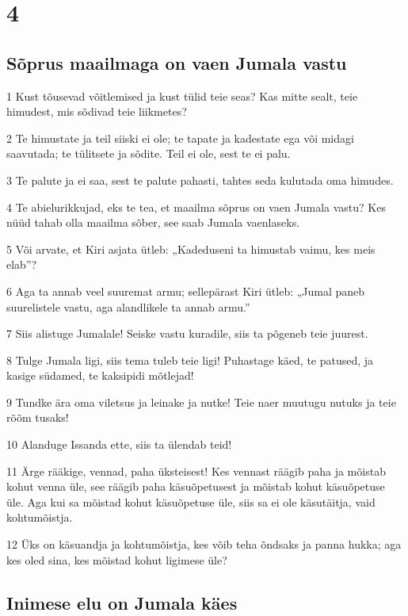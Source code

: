 \chapter{4}

\section*{Sõprus maailmaga on vaen Jumala vastu}

\par 1 Kust tõusevad võitlemised ja kust tülid teie seas? Kas mitte sealt, teie himudest, mis sõdivad teie liikmetes?
\par 2 Te himustate ja teil siiski ei ole; te tapate ja kadestate ega või midagi saavutada; te tülitsete ja sõdite. Teil ei ole, sest te ei palu.
\par 3 Te palute ja ei saa, sest te palute pahasti, tahtes seda kulutada oma himudes.
\par 4 Te abielurikkujad, eks te tea, et maailma sõprus on vaen Jumala vastu? Kes nüüd tahab olla maailma sõber, see saab Jumala vaenlaseks.
\par 5 Või arvate, et Kiri asjata ütleb: „Kadeduseni ta himustab vaimu, kes meis elab”?
\par 6 Aga ta annab veel suuremat armu; sellepärast Kiri ütleb: „Jumal paneb suurelistele vastu, aga alandlikele ta annab armu.”
\par 7 Siis alistuge Jumalale! Seiske vastu kuradile, siis ta põgeneb teie juurest.
\par 8 Tulge Jumala ligi, siis tema tuleb teie ligi! Puhastage käed, te patused, ja kasige südamed, te kaksipidi mõtlejad!
\par 9 Tundke ära oma viletsus ja leinake ja nutke! Teie naer muutugu nutuks ja teie rõõm tusaks!
\par 10 Alanduge Issanda ette, siis ta ülendab teid!
\par 11 Ärge rääkige, vennad, paha üksteisest! Kes vennast räägib paha ja mõistab kohut venna üle, see räägib paha käsuõpetusest ja mõistab kohut käsuõpetuse üle. Aga kui sa mõistad kohut käsuõpetuse üle, siis sa ei ole käsutäitja, vaid kohtumõistja.
\par 12 Üks on käsuandja ja kohtumõistja, kes võib teha õndsaks ja panna hukka; aga kes oled sina, kes mõistad kohut ligimese üle?

\section*{Inimese elu on Jumala käes}

